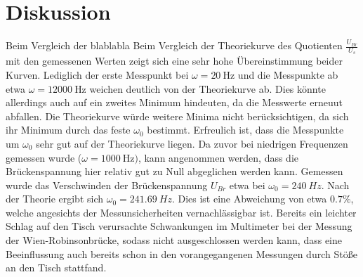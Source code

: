 \section{Diskussion}
\label{sec:Diskussion}
Beim Vergleich der blablabla %
Beim Vergleich der Theoriekurve des Quotienten $\frac{U_{Br}}{U_s}$ mit den gemessenen Werten zeigt sich eine sehr hohe Übereinstimmung beider Kurven. Lediglich der erste Messpunkt
bei $\omega=\SI{20}{\Hz}$ und die Messpunkte ab etwa $\omega=\SI{12000}{\Hz}$ weichen deutlich von der Theoriekurve ab. Dies könnte allerdings auch auf ein zweites Minimum hindeuten, da die Messwerte erneuut abfallen. Die Theoriekurve würde weitere Minima nicht berücksichtigen, da sich ihr Minimum durch das feste $\omega_0$ bestimmt.
Erfreulich ist, dass die Messpunkte um $\omega_0$ sehr gut auf der Theoriekurve liegen.
Da zuvor bei niedrigen Frequenzen gemessen wurde ($\omega=\SI{1000}{\Hz})$, kann angenommen werden, dass die Brückenspannung hier relativ gut zu Null abgeglichen werden kann. Gemessen wurde das Verschwinden der Brückenspannung
$U_{Br}$ etwa bei $\omega_0=\SI{240}{Hz}$. Nach der Theorie ergibt sich $\omega_0=\SI{241.69}{Hz}$. Dies ist eine Abweichung von etwa $0.7\%$, welche angesichts der Messunsicherheiten vernachlässigbar ist.
Bereits ein leichter Schlag auf den Tisch verursachte Schwankungen im Multimeter bei der Messung der Wien-Robinsonbrücke, sodass nicht ausgeschlossen werden kann, dass eine Beeinflussung auch bereits schon in den vorangegangenen Messungen durch Stöße an den Tisch stattfand.
